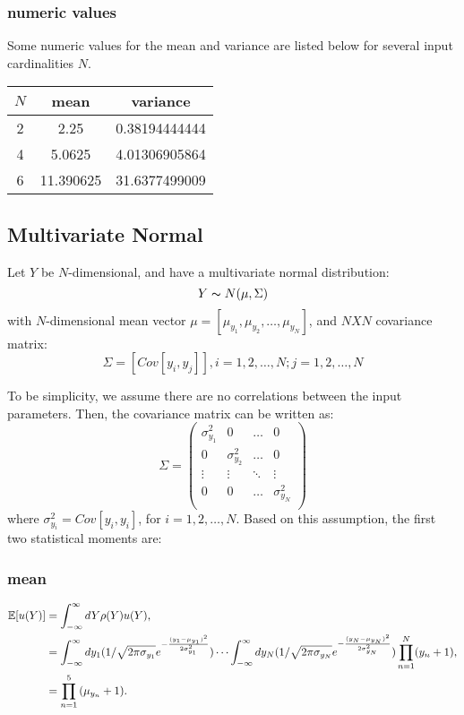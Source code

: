 \subsubsection{numeric values}
Some numeric values for the mean and variance are listed below for several input cardinalities $N$.
\begin{table}[h!]
  \centering
  \begin{tabular}{c|c|c}
    $N$ & mean & variance \\ \hline
    2 & 2.25      & 0.38194444444 \\
    4 & 5.0625    & 4.01306905864 \\
    6 & 11.390625 & 31.6377499009
  \end{tabular}
\end{table}

\subsection{Multivariate Normal}
Let $Y$ be $N$-dimensional, and have a multivariate normal distribution:
\begin{equation}
Y \thicksim N(\mu,\Sigma)
\end{equation}
with $N$-dimensional mean vector $\mu=[\mu_{y_1},\mu_{y_2},\ldots,\mu_{y_N}]$, and $N X N$ covariance matrix:
\begin{equation}
\Sigma = [Cov[y_i,y_j]],i = 1,2,\ldots,N; j = 1,2,\ldots,N
\end{equation}

To be simplicity, we assume there are no correlations between the input parameters. Then, the covariance matrix can be written
as:
\begin{equation}
\Sigma =
\begin{pmatrix}
\sigma_{y_1}^2 & 0 &\ldots & 0 \\
0 & \sigma_{y_2}^2 &\ldots & 0 \\
\vdots &\vdots &\ddots & \vdots \\
0 & 0 & \ldots & \sigma_{y_N}^2\\
\end{pmatrix}
\end{equation}
where $\sigma_{y_i}^2 = Cov[y_i,y_i]$, for $i = 1,2,\ldots,N$. Based on this assumption, the first two statistical moments are:

\subsubsection{mean}
\begin{align}
\mathbb{E}[ u(Y)] &=\int_{-\infty}^\infty dY \rho(Y)u(Y),\notag \\
  &=\int_{-\infty}^\infty dy_1 (1/\sqrt{2 \pi \sigma_{y_1}}e^{-\frac{(y_1-\mu_{y_1})^2}{2\sigma_{y_1}^2}})\cdots\int_{-\infty}^\infty dy_N (1/\sqrt{2 \pi \sigma_{y_N}}e^{-\frac{(y_N-\mu_{y_N})^2}{2\sigma_{y_N}^2}})\prod_{n=1}^N (y_n+1),\\
  &=\prod_{n=1}^5{(\mu_{y_n}+1)}.\notag
\end{align}

